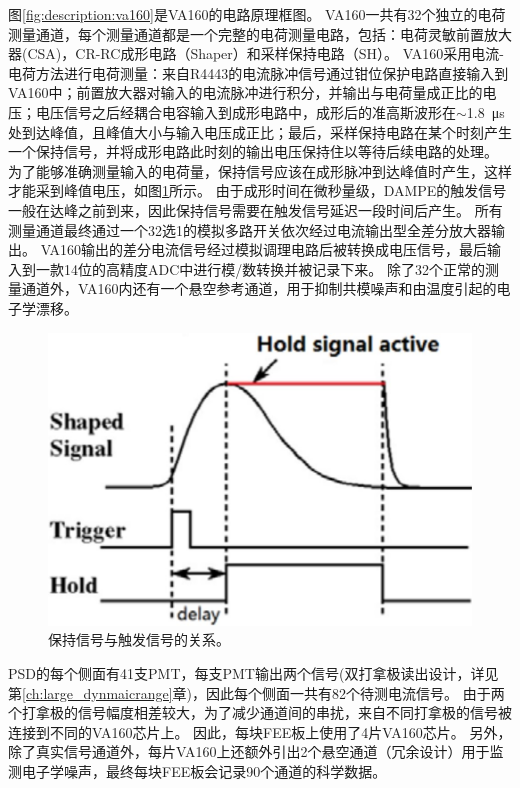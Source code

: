图\ref{fig:description:va160}是VA160的电路原理框图。
VA160一共有32个独立的电荷测量通道，每个测量通道都是一个完整的电荷测量电路，包括：电荷灵敏前置放大器(CSA)，CR-RC成形电路（Shaper）和采样保持电路（SH）。
VA160采用电流-电荷方法进行电荷测量：来自R4443的电流脉冲信号通过钳位保护电路直接输入到VA160中；前置放大器对输入的电流脉冲进行积分，并输出与电荷量成正比的电压；电压信号之后经耦合电容输入到成形电路中，成形后的准高斯波形在$\sim$\SI{1.8}{\micro\second}处到达峰值，且峰值大小与输入电压成正比；最后，采样保持电路在某个时刻产生一个保持信号，并将成形电路此时刻的输出电压保持住以等待后续电路的处理。
为了能够准确测量输入的电荷量，保持信号应该在成形脉冲到达峰值时产生，这样才能采到峰值电压，如图\ref{fig:description:sample_hold}所示。
由于成形时间在微秒量级，DAMPE的触发信号一般在达峰之前到来，因此保持信号需要在触发信号延迟一段时间后产生。
所有测量通道最终通过一个32选1的模拟多路开关依次经过电流输出型全差分放大器输出。
VA160输出的差分电流信号经过模拟调理电路后被转换成电压信号，最后输入到一款14位的高精度ADC中进行模/数转换并被记录下来。
除了32个正常的测量通道外，VA160内还有一个悬空参考通道，用于抑制共模噪声和由温度引起的电子学漂移。

\begin{figure}[h!]	
	\centering
	\includegraphics[width=0.5\linewidth]{chap/description/fig/sample_hold}
	\caption{保持信号与触发信号的关系。}
	\label{fig:description:sample_hold}
\end{figure}

PSD的每个侧面有41支PMT，每支PMT输出两个信号(双打拿极读出设计，详见第\ref{ch:large_dynmaicrange}章)，因此每个侧面一共有82个待测电流信号。
由于两个打拿极的信号幅度相差较大，为了减少通道间的串扰，来自不同打拿极的信号被连接到不同的VA160芯片上。
因此，每块FEE板上使用了4片VA160芯片。
另外，除了真实信号通道外，每片VA160上还额外引出2个悬空通道（冗余设计）用于监测电子学噪声，最终每块FEE板会记录90个通道的科学数据。

